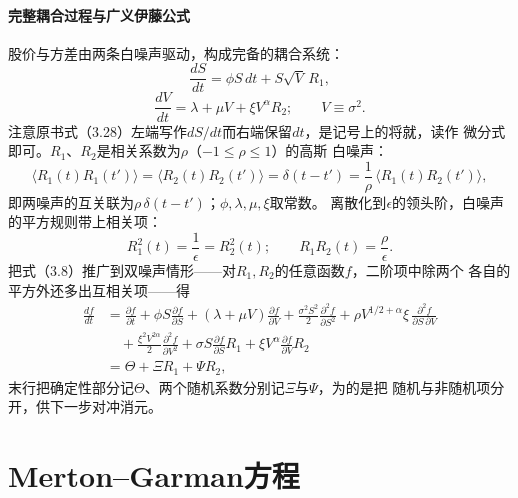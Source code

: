 \paragraph{完整耦合过程与广义伊藤公式}
股价与方差由两条白噪声驱动，构成完备的耦合系统：
\begin{equation*}
\frac{dS}{dt}=\phi S\,dt+S\sqrt{V}\,R_{1},
\tag{3.28}
\end{equation*}
\begin{equation*}
\frac{dV}{dt}=\lambda+\mu V+\xi V^{\alpha}R_{2};\qquad V\equiv\sigma^{2}.
\tag{3.29}
\end{equation*}
注意原书式（3.28）左端写作$dS/dt$而右端保留$dt$，是记号上的将就，读作
微分式即可。$R_1$、$R_2$是相关系数为$\rho$（$-1\leq\rho\leq 1$）的高斯
白噪声：
\begin{equation*}
\langle R_{1}(t)R_{1}(t')\rangle=\langle R_{2}(t)R_{2}(t')\rangle
=\delta(t-t')=\frac{1}{\rho}\,\langle R_{1}(t)R_{2}(t')\rangle,
\tag{3.30}
\end{equation*}
即两噪声的互关联为$\rho\,\delta(t-t')$；$\phi,\lambda,\mu,\xi$取常数。
离散化到$\epsilon$的领头阶，白噪声的平方规则带上相关项：
\begin{equation*}
R_{1}^{2}(t)=\frac{1}{\epsilon}=R_{2}^{2}(t);\qquad
R_{1}R_{2}(t)=\frac{\rho}{\epsilon}.
\tag{3.31}
\end{equation*}
把式（3.8）推广到双噪声情形——对$R_1,R_2$的任意函数$f$，二阶项中除两个
各自的平方外还多出互相关项——得
\begin{align*}
\frac{df}{dt}
&=\frac{\partial f}{\partial t}
+\phi S\frac{\partial f}{\partial S}
+(\lambda+\mu V)\frac{\partial f}{\partial V}
+\frac{\sigma^{2}S^{2}}{2}\frac{\partial^{2}f}{\partial S^{2}}
+\rho V^{1/2+\alpha}\xi\,\frac{\partial^{2}f}{\partial S\,\partial V}\\
&\quad+\frac{\xi^{2}V^{2\alpha}}{2}\frac{\partial^{2}f}{\partial V^{2}}
+\sigma S\frac{\partial f}{\partial S}R_{1}
+\xi V^{\alpha}\frac{\partial f}{\partial V}R_{2}\\
&=\Theta+\Xi R_{1}+\Psi R_{2},
\tag{3.32}
\end{align*}
末行把确定性部分记$\Theta$、两个随机系数分别记$\Xi$与$\Psi$，为的是把
随机与非随机项分开，供下一步对冲消元。

\section{Merton--Garman方程}

